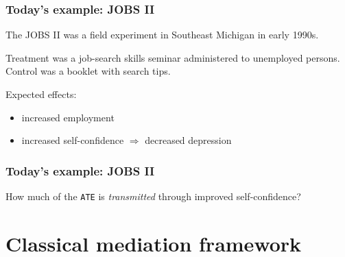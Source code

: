 \documentclass[11pt,english,dvipsnames,aspectratio=169,handout]{beamer}\usepackage[]{graphicx}\usepackage[]{xcolor}
\begin{document}
\begin{frame}
\frametitle{Today's example: JOBS II}
The JOBS II was a field experiment in Southeast Michigan in early 1990s.\bigskip

Treatment was a job-search skills seminar administered to unemployed persons. Control was a booklet with search tips.\bigskip
\pause

Expected effects:

\begin{itemize}
  \item increased employment\pause
  \item increased self-confidence $\Rightarrow$ decreased depression
\end{itemize}

\end{frame}


\begin{frame}
\frametitle{Today's example: JOBS II}

\begin{figure}
\label{fig:01}
\end{figure}

How much of the \texttt{ATE} is \textit{transmitted} through improved self-confidence?

\end{frame}


\section{Classical mediation framework}
\end{document}
